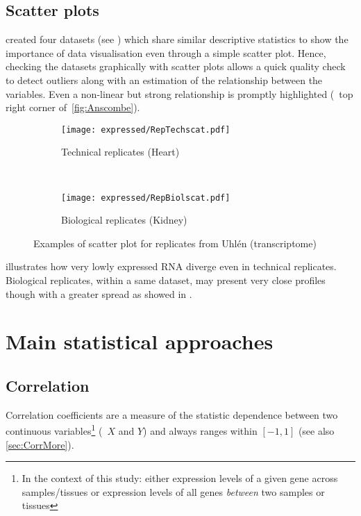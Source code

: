 \subsection{Scatter plots}

\cite{anscombe} created four datasets (see )
which share similar descriptive statistics to show the importance
of data visualisation even through a simple scatter plot.
Hence, checking the datasets graphically with scatter plots
allows a quick quality check to detect outliers along with an
estimation of the relationship between the variables.
Even a non-linear but strong relationship is promptly highlighted
(\eg\ top right corner of~\cref{fig:Anscombe}).

\begin{figure}
    \centering
    \begin{subfigure}[b]{0.45\textwidth}
        \centering \texttt{[image: expressed/RepTechscat.pdf]}
        \caption{Technical replicates (Heart)}\label{fig:scatTechRep}
    \end{subfigure}~%
    \begin{subfigure}[b]{0.45\textwidth}
    \centering \texttt{[image: expressed/RepBiolscat.pdf]}
        \caption{Biological replicates (Kidney)}\label{fig:scatBiolRep}
    \end{subfigure}
    \caption{Examples of scatter plot for replicates from Uhlén
    (transcriptome)}\label{fig:scatEg}
\end{figure}

 illustrates how very lowly expressed \gls{RNA}
diverge even in technical replicates.
Biological replicates, within a same dataset,
may present very close profiles though with a greater spread
as showed in .


\section{Main statistical approaches}

\subsection{Correlation}

Correlation coefficients are a measure of the statistic dependence between two
continuous variables\footnote{In the context of this study: either expression
levels of a given gene across samples/tissues or expression levels of all genes
\emph{between} two samples or tissues} (\eg\
$X$ and $Y$) and always ranges within $[-1,1]$ (see also \cref{sec:CorrMore}).

